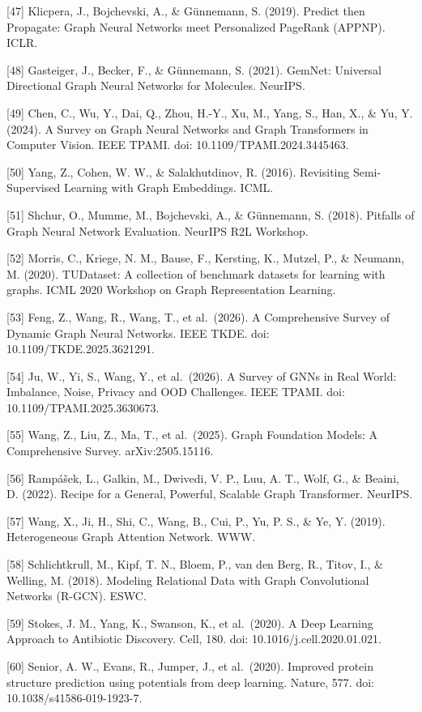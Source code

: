{[}47{]} Klicpera, J., Bojchevski, A., \& Günnemann, S. (2019). Predict then Propagate: Graph Neural Networks meet Personalized PageRank (APPNP). ICLR.

{[}48{]} Gasteiger, J., Becker, F., \& Günnemann, S. (2021). GemNet: Universal Directional Graph Neural Networks for Molecules. NeurIPS.

{[}49{]} Chen, C., Wu, Y., Dai, Q., Zhou, H.-Y., Xu, M., Yang, S., Han, X., \& Yu, Y. (2024). A Survey on Graph Neural Networks and Graph Transformers in Computer Vision. IEEE TPAMI. doi: 10.1109/TPAMI.2024.3445463.

{[}50{]} Yang, Z., Cohen, W. W., \& Salakhutdinov, R. (2016). Revisiting Semi-Supervised Learning with Graph Embeddings. ICML.

{[}51{]} Shchur, O., Mumme, M., Bojchevski, A., \& Günnemann, S. (2018). Pitfalls of Graph Neural Network Evaluation. NeurIPS R2L Workshop.

{[}52{]} Morris, C., Kriege, N. M., Bause, F., Kersting, K., Mutzel, P., \& Neumann, M. (2020). TUDataset: A collection of benchmark datasets for learning with graphs. ICML 2020 Workshop on Graph Representation Learning.

{[}53{]} Feng, Z., Wang, R., Wang, T., et al.~(2026). A Comprehensive Survey of Dynamic Graph Neural Networks. IEEE TKDE. doi: 10.1109/TKDE.2025.3621291.

{[}54{]} Ju, W., Yi, S., Wang, Y., et al.~(2026). A Survey of GNNs in Real World: Imbalance, Noise, Privacy and OOD Challenges. IEEE TPAMI. doi: 10.1109/TPAMI.2025.3630673.

{[}55{]} Wang, Z., Liu, Z., Ma, T., et al.~(2025). Graph Foundation Models: A Comprehensive Survey. arXiv:2505.15116.

{[}56{]} Rampášek, L., Galkin, M., Dwivedi, V. P., Luu, A. T., Wolf, G., \& Beaini, D. (2022). Recipe for a General, Powerful, Scalable Graph Transformer. NeurIPS.

{[}57{]} Wang, X., Ji, H., Shi, C., Wang, B., Cui, P., Yu, P. S., \& Ye, Y. (2019). Heterogeneous Graph Attention Network. WWW.

{[}58{]} Schlichtkrull, M., Kipf, T. N., Bloem, P., van den Berg, R., Titov, I., \& Welling, M. (2018). Modeling Relational Data with Graph Convolutional Networks (R-GCN). ESWC.

{[}59{]} Stokes, J. M., Yang, K., Swanson, K., et al.~(2020). A Deep Learning Approach to Antibiotic Discovery. Cell, 180. doi: 10.1016/j.cell.2020.01.021.

{[}60{]} Senior, A. W., Evans, R., Jumper, J., et al.~(2020). Improved protein structure prediction using potentials from deep learning. Nature, 577. doi: 10.1038/s41586-019-1923-7.

